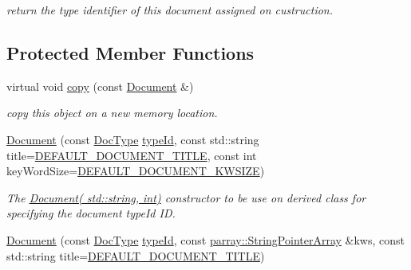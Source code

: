 \begin{DoxyCompactItemize}
\begin{DoxyCompactList}\small\item\em return the type identifier of this document assigned on custruction. \end{DoxyCompactList}\end{DoxyCompactItemize}
\subsection*{Protected Member Functions}
\begin{DoxyCompactItemize}
\item 
\hypertarget{classdocs_1_1Document_ad8b6a91c7a8e39a880790d14aba14322}{virtual void \hyperlink{classdocs_1_1Document_ad8b6a91c7a8e39a880790d14aba14322}{copy} (const \hyperlink{classdocs_1_1Document}{Document} \&)}\label{classdocs_1_1Document_ad8b6a91c7a8e39a880790d14aba14322}

\begin{DoxyCompactList}\small\item\em copy this object on a new memory location. \end{DoxyCompactList}\item 
\hypertarget{classdocs_1_1Document_a9f0b2c4c1a3e3344f374330399969e90}{\hyperlink{classdocs_1_1Document_a9f0b2c4c1a3e3344f374330399969e90}{Document} (const \hyperlink{classdocs_1_1DocType}{Doc\-Type} \hyperlink{classdocs_1_1Document_ad5250ef4bd98928dfbe6243162536389}{type\-Id}, const std\-::string title=\hyperlink{namespacedocs_a4cf6dd6732c7e7ab7f7855e440485d89}{D\-E\-F\-A\-U\-L\-T\-\_\-\-D\-O\-C\-U\-M\-E\-N\-T\-\_\-\-T\-I\-T\-L\-E}, const int key\-Word\-Size=\hyperlink{namespacedocs_ae635b9481a61628036b5a97625856475}{D\-E\-F\-A\-U\-L\-T\-\_\-\-D\-O\-C\-U\-M\-E\-N\-T\-\_\-\-K\-W\-S\-I\-Z\-E})}\label{classdocs_1_1Document_a9f0b2c4c1a3e3344f374330399969e90}

\begin{DoxyCompactList}\small\item\em The \hyperlink{classdocs_1_1Document_ace8d18f691181e1676a6ca5207da336b}{Document( std\-::string, int)} constructor to be use on derived class for specifying the document type\-Id I\-D. \end{DoxyCompactList}\item 
\hypertarget{classdocs_1_1Document_a4a76d0cee2709582e4b9f3b5b8db0277}{\hyperlink{classdocs_1_1Document_a4a76d0cee2709582e4b9f3b5b8db0277}{Document} (const \hyperlink{classdocs_1_1DocType}{Doc\-Type} \hyperlink{classdocs_1_1Document_ad5250ef4bd98928dfbe6243162536389}{type\-Id}, const \hyperlink{classparray_1_1StringPointerArray}{parray\-::\-String\-Pointer\-Array} \&kws, const std\-::string title=\hyperlink{namespacedocs_a4cf6dd6732c7e7ab7f7855e440485d89}{D\-E\-F\-A\-U\-L\-T\-\_\-\-D\-O\-C\-U\-M\-E\-N\-T\-\_\-\-T\-I\-T\-L\-E})}\label{classdocs_1_1Document_a4a76d0cee2709582e4b9f3b5b8db0277}


\end{DoxyCompactItemize}
